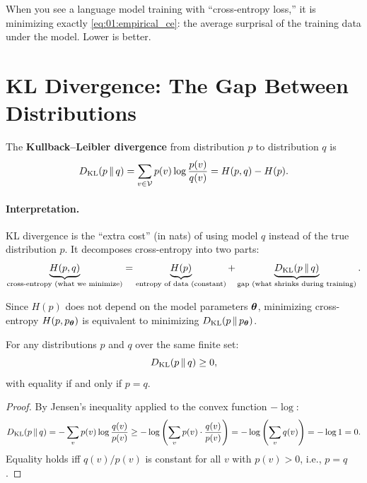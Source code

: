 \begin{keyinsight}
When you see a language model training with ``cross-entropy loss,'' it is minimizing exactly \cref{eq:01:empirical_ce}: the average surprisal of the training data under the model. Lower is better.
\end{keyinsight}


\section{KL Divergence: The Gap Between Distributions}
\label{ch:01:sec:kl}

\begin{definition}[KL divergence]
\label{def:01:kl}
The \textbf{Kullback--Leibler divergence} from distribution $p$ to distribution $q$ is
\begin{equation}
\label{eq:01:kl}
D_{\mathrm{KL}}\!\left(p \,\|\, q\right) = \sum_{v \in \mathcal{V}} p(v) \log \frac{p(v)}{q(v)} = H(p, q) - H(p).
\end{equation}
\end{definition}

\paragraph{Interpretation.} KL divergence is the ``extra cost'' (in nats) of using model $q$ instead of the true distribution $p$. It decomposes cross-entropy into two parts:
\begin{equation}
\underbrace{H(p, q)}_{\text{cross-entropy (what we minimize)}} = \underbrace{H(p)}_{\text{entropy of data (constant)}} + \underbrace{D_{\mathrm{KL}}\!\left(p \,\|\, q\right)}_{\text{gap (what shrinks during training)}}.
\end{equation}

Since $H(p)$ does not depend on the model parameters $\boldsymbol{\theta}$, minimizing cross-entropy $H(p, p_{\boldsymbol{\theta}})$ is equivalent to minimizing $D_{\mathrm{KL}}\!\left(p \,\|\, p_{\boldsymbol{\theta}}\right)$.

\begin{proposition}
\label{prop:01:gibbs}
For any distributions $p$ and $q$ over the same finite set:
\begin{equation}
D_{\mathrm{KL}}\!\left(p \,\|\, q\right) \geq 0,
\end{equation}
with equality if and only if $p = q$.
\end{proposition}

\begin{proof}
By Jensen's inequality applied to the convex function $-\log$:
\begin{equation}
D_{\mathrm{KL}}\!\left(p \,\|\, q\right) = -\sum_v p(v) \log \frac{q(v)}{p(v)} \geq -\log\left(\sum_v p(v) \cdot \frac{q(v)}{p(v)}\right) = -\log\left(\sum_v q(v)\right) = -\log 1 = 0.
\end{equation}
Equality holds iff $q(v)/p(v)$ is constant for all $v$ with $p(v) > 0$, i.e., $p = q$.
\end{proof}

